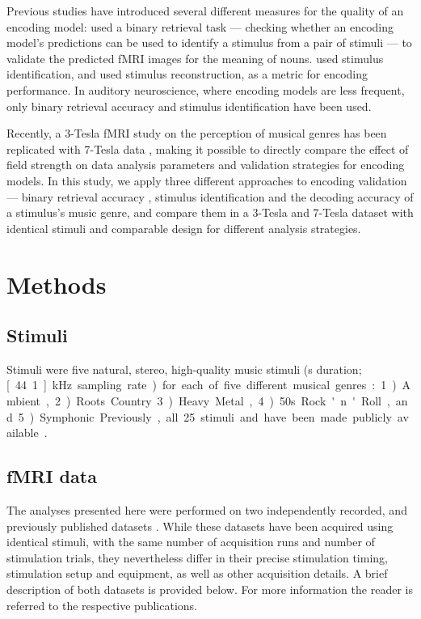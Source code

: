 Previous studies have introduced several different measures for the quality of an
encoding model: \citet{ML08} used a binary retrieval task --- checking whether an encoding model's predictions
can be used to identify a stimulus from a pair of stimuli ---
to validate the predicted f{MRI} images for the meaning of nouns. \citet{KG+08} used stimulus
identification, and \citet{NG09} used stimulus reconstruction,
as a metric for encoding performance. In auditory neuroscience, where encoding models are less
frequent, only binary retrieval accuracy \citep{CTK+2012} and stimulus
identification \citep{SF14} have been used.

Recently, a 3-Tesla f{MRI} study on the perception of
musical genres \citep{CTK+2012} has been replicated with 7-Tesla data
\citep{HDH+2015}, making it possible to directly compare the effect of field
strength on data analysis parameters and validation strategies for encoding models. In this study,
we apply three different approaches to encoding validation --- binary retrieval accuracy \citep{ML08},
stimulus identification \citep{KG+08,SF14} and the decoding accuracy of a
stimulus's music genre, and compare them in a 3-Tesla and 7-Tesla dataset with
identical stimuli and comparable design for different analysis strategies.


\section*{Methods}

\subsection*{Stimuli}

Stimuli were five natural, stereo, high-quality music stimuli (\unit[6]{s}
duration; \unit[44.1]{kHz} sampling rate) for each of five different musical
genres: 1) Ambient, 2) Roots Country 3) Heavy Metal, 4) 50s Rock'n'Roll, and 5)
Symphonic. Previously, all 25 stimuli and have been made publicly available \citep{HDH+2015}.

\subsection*{fMRI data}

The analyses presented here were performed on two independently recorded, and
previously published datasets \citep{CTK+2012,HDH+2015} . While these datasets
have been acquired using identical stimuli, with the same number of acquisition
runs and number of stimulation trials, they nevertheless differ in their
precise stimulation timing, stimulation setup and equipment, as well as other
acquisition details. A brief description of both datasets is provided below.
For more information the reader is referred to the respective publications.

